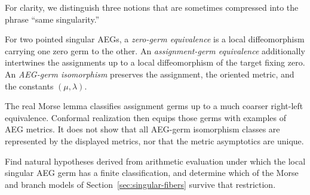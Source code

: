 For clarity, we distinguish three notions that are sometimes compressed into the
phrase ``same singularity.''

\begin{definition}
\label{def:three-local-equivalences}
For two pointed singular AEGs, a \emph{zero-germ equivalence} is a local
diffeomorphism carrying one zero germ to the other.  An \emph{assignment-germ
equivalence} additionally intertwines the assignments up to a local diffeomorphism
of the target fixing zero.  An \emph{AEG-germ isomorphism} preserves the assignment,
the oriented metric, and the constants $(\mu,\lambda)$.
\end{definition}

The real Morse lemma classifies assignment germs up to a much coarser right-left
equivalence.  Conformal realization then equips those germs with examples of AEG
metrics.  It does not show that all AEG-germ isomorphism classes are represented by
the displayed metrics, nor that the metric asymptotics are unique.

\begin{problem}
\label{prob:singular-rigidity}
Find natural hypotheses derived from arithmetic evaluation under which the local
singular AEG germ has a finite classification, and determine which of the Morse and
branch models of Section~\ref{sec:singular-fibers} survive that restriction.
\end{problem}
